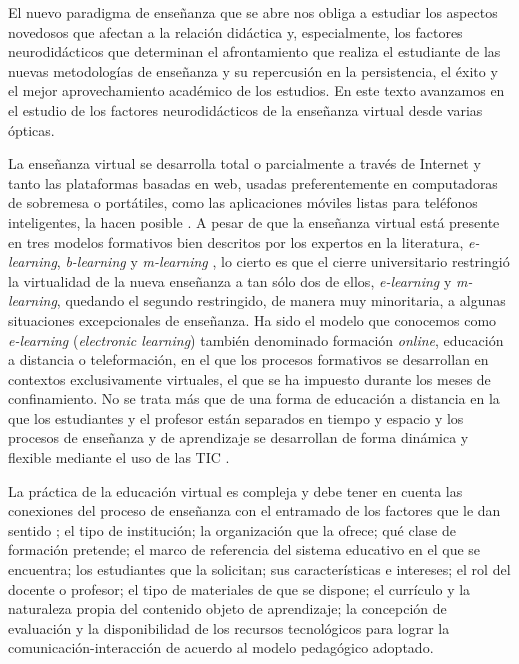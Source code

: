 \documentclass[spanish]{textolivre}
\begin{document}
El nuevo paradigma de enseñanza que se abre nos obliga a estudiar los aspectos novedosos que afectan a la relación didáctica y, especialmente, los factores neurodidácticos que determinan el afrontamiento que realiza el estudiante de las nuevas metodologías de enseñanza y su repercusión en la persistencia, el éxito y el mejor aprovechamiento académico de los estudios. En este texto avanzamos en el estudio de los factores neurodidácticos de la enseñanza virtual desde varias ópticas.

La enseñanza virtual se desarrolla total o parcialmente a través de Internet y tanto las plataformas basadas en web, usadas preferentemente en computadoras de sobremesa o portátiles, como las aplicaciones móviles listas para teléfonos inteligentes, la hacen posible \cite{ko_teaching_2017}. A pesar de que la enseñanza virtual está presente en tres modelos formativos bien descritos por los expertos en la literatura, \textit{e-learning}, \textit{b-learning} y \textit{m-learning} \cite{bonk_moocs_2015,salinas_tic_2015,verdun_educacion_2016}, lo cierto es que el cierre universitario restringió la virtualidad de la nueva enseñanza a tan sólo dos de ellos, \textit{e-learning} y \textit{m-learning}, quedando el segundo restringido, de manera muy minoritaria, a algunas situaciones excepcionales de enseñanza. Ha sido el modelo que conocemos como \textit{e-learning} (\textit{electronic learning}) también denominado formación \textit{online}, educación a distancia o teleformación, en el que los procesos formativos se desarrollan en contextos exclusivamente virtuales, el que se ha impuesto durante los meses de confinamiento. No se trata más que de una forma de educación a distancia en la que los estudiantes y el profesor están separados en tiempo y espacio y los procesos de enseñanza y de aprendizaje se desarrollan de forma dinámica y flexible mediante el uso de las TIC \cite{garcia-marcos_autorregulacion_2020,gros_salvat_evolucion_2018}.

La práctica de la educación virtual es compleja y debe tener en cuenta las conexiones del proceso de enseñanza con el entramado de los factores que le dan sentido \cite{barbera_gregori_incognita_2001,telleria_educacion_2004}; el tipo de institución; la organización que la ofrece; qué clase de formación pretende; el marco de referencia del sistema educativo en el que se encuentra; los estudiantes que la solicitan; sus características e intereses; el rol del docente o profesor; el tipo de materiales de que se dispone; el currículo y la naturaleza propia del contenido objeto de aprendizaje; la concepción de evaluación y la disponibilidad de los recursos tecnológicos para lograr la comunicación-interacción de acuerdo al modelo pedagógico adoptado.
\end{document}
